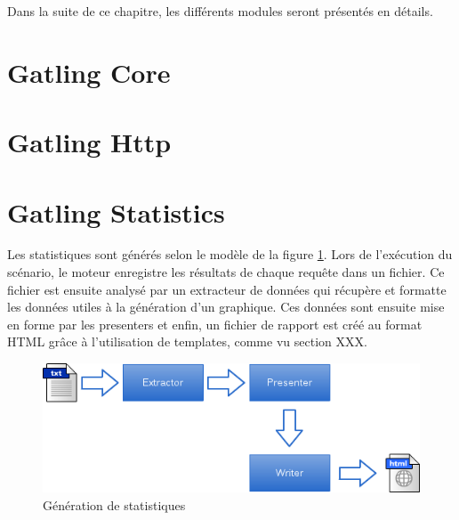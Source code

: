 Dans la suite de ce chapitre, les différents modules seront présentés en détails.

\section{Gatling Core}
\subsection{}

\section{Gatling Http}

\section{Gatling Statistics}
Les statistiques sont générés selon le modèle de la figure \ref{stats_gen}. Lors de l'exécution du scénario, le moteur enregistre les résultats de chaque requête dans un fichier. Ce fichier est ensuite analysé par un extracteur de données qui récupère et formatte les données utiles à la génération d'un graphique. Ces données sont ensuite mise en forme par les presenters et enfin, un fichier de rapport est créé au format HTML grâce à l'utilisation de templates, comme vu section XXX.

\begin{figure}[h]
\begin{center}
\includegraphics{img/stats_gen.png}
\end{center}
\caption{Génération de statistiques}
\label{stats_gen}
\end{figure}

